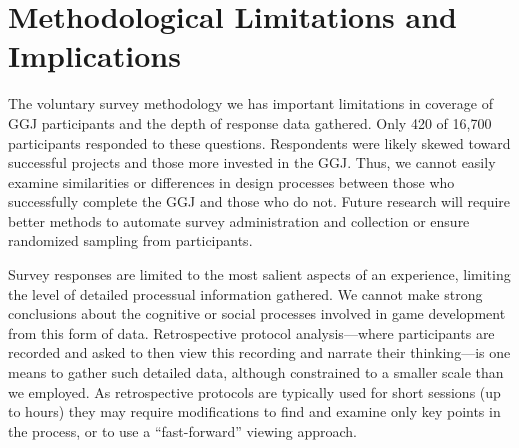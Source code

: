 \documentclass{sig-alternate}
\begin{document}




\section{Methodological Limitations and Implications}
The voluntary survey methodology we has important limitations in coverage of GGJ participants and the depth of response data gathered. Only 420 of 16,700 participants responded to these questions. Respondents were likely skewed toward successful projects and those more invested in the GGJ. Thus, we cannot easily examine similarities or differences in design processes between those who successfully complete the GGJ and those who do not. Future research will require better methods to automate survey administration and collection or ensure randomized sampling from participants.

Survey responses are limited to the most salient aspects of an experience, limiting the level of detailed processual information gathered. We cannot make strong conclusions about the cognitive or social processes involved in game development from this form of data. Retrospective protocol analysis---where participants are recorded and asked to then view this recording and narrate their thinking---is one means to gather such detailed data, although constrained to a smaller scale than we employed. As retrospective protocols are typically used for short sessions (up to hours) they may require modifications to find and examine only key points in the process, or to use a ``fast-forward'' viewing approach. 
\end{document}
